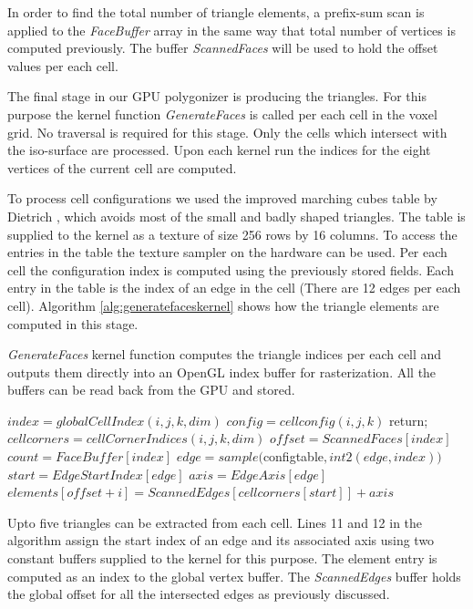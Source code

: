 In order to find the total number of triangle elements, a prefix-sum scan is applied to the \textit{FaceBuffer} array 
in the same way that total number of vertices is computed previously. The buffer \textit{ScannedFaces} will be used to hold the 
offset values per each cell. 

The final stage in our GPU polygonizer is producing the triangles. For this purpose the kernel function \textit{GenerateFaces} 
is called per each cell in the voxel grid. No \blob traversal is required for this stage. Only the cells which intersect with the 
iso-surface are processed. Upon each kernel run the indices for the eight vertices of the current cell are computed. 

To process cell configurations we used the improved marching cubes table by Dietrich \etal 
\cite{Dietrich2009}, which avoids most of the small and badly shaped triangles. The table is supplied to the kernel as 
a texture of size 256 rows by 16 columns. To access the entries in the table the texture sampler on the hardware 
can be used. Per each cell the configuration index is computed using the previously stored fields. Each entry in the table is the 
index of an edge in the cell (There are 12 edges per each cell). Algorithm \ref{alg:generatefaceskernel} shows how the 
triangle elements are computed in this stage.

\begin{algorithm}[H]
\caption{\textit{GenerateFaces} kernel function computes the triangle indices per each cell and outputs them directly into an
OpenGL index buffer for rasterization. All the buffers can be read back from the GPU and stored.}
\label{alg:generatefaceskernel}
\begin{algorithmic}[1]	 
  \STATE $index = globalCellIndex(i, j, k, dim)$
  \STATE $config = cellconfig(i, j, k)$
	  \STATE return;
	  \ENDIF	
   \STATE $cellcorners = cellCornerIndices(i, j, k, dim)$
   \STATE $offset = ScannedFaces[index]$
   \STATE $count = FaceBuffer[index]$
	 \STATE $edge = sample($configtable$, int2(edge, index))$
	 \STATE $start = EdgeStartIndex[edge]$
	 \STATE $axis = EdgeAxis[edge]$
	 \STATE $elements[offset + i] = ScannedEdges[cellcorners[start]] + axis$
   \ENDFOR				

\end{algorithmic}
\end{algorithm}


Upto five triangles can be extracted from each cell. Lines 11 and 12 in the algorithm assign the start index of an 
edge and its associated axis using two constant buffers supplied to the kernel for this purpose. 
The element entry is computed as an index to the global vertex buffer. The \textit{ScannedEdges} 
buffer holds the global offset for all the intersected edges as previously discussed. 

